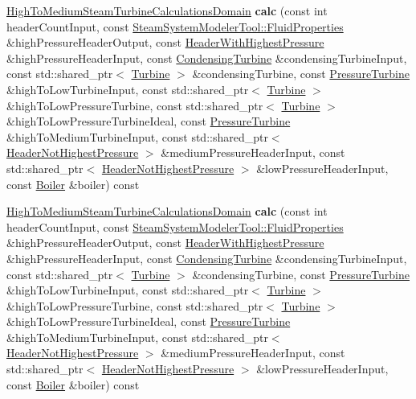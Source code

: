 \begin{DoxyCompactItemize}
\hyperlink{class_high_to_medium_steam_turbine_calculations_domain}{High\+To\+Medium\+Steam\+Turbine\+Calculations\+Domain} {\bfseries calc} (const int header\+Count\+Input, const \hyperlink{struct_steam_system_modeler_tool_1_1_fluid_properties}{Steam\+System\+Modeler\+Tool\+::\+Fluid\+Properties} \&high\+Pressure\+Header\+Output, const \hyperlink{class_header_with_highest_pressure}{Header\+With\+Highest\+Pressure} \&high\+Pressure\+Header\+Input, const \hyperlink{class_condensing_turbine}{Condensing\+Turbine} \&condensing\+Turbine\+Input, const std\+::shared\+\_\+ptr$<$ \hyperlink{class_turbine}{Turbine} $>$ \&condensing\+Turbine, const \hyperlink{class_pressure_turbine}{Pressure\+Turbine} \&high\+To\+Low\+Turbine\+Input, const std\+::shared\+\_\+ptr$<$ \hyperlink{class_turbine}{Turbine} $>$ \&high\+To\+Low\+Pressure\+Turbine, const std\+::shared\+\_\+ptr$<$ \hyperlink{class_turbine}{Turbine} $>$ \&high\+To\+Low\+Pressure\+Turbine\+Ideal, const \hyperlink{class_pressure_turbine}{Pressure\+Turbine} \&high\+To\+Medium\+Turbine\+Input, const std\+::shared\+\_\+ptr$<$ \hyperlink{class_header_not_highest_pressure}{Header\+Not\+Highest\+Pressure} $>$ \&medium\+Pressure\+Header\+Input, const std\+::shared\+\_\+ptr$<$ \hyperlink{class_header_not_highest_pressure}{Header\+Not\+Highest\+Pressure} $>$ \&low\+Pressure\+Header\+Input, const \hyperlink{class_boiler}{Boiler} \&boiler) const
\item 
\mbox{\label{class_high_to_medium_steam_turbine_calculator_a5cc5be18b84b9dd14a955b06c4d3ac5c}} 
\hyperlink{class_high_to_medium_steam_turbine_calculations_domain}{High\+To\+Medium\+Steam\+Turbine\+Calculations\+Domain} {\bfseries calc} (const int header\+Count\+Input, const \hyperlink{struct_steam_system_modeler_tool_1_1_fluid_properties}{Steam\+System\+Modeler\+Tool\+::\+Fluid\+Properties} \&high\+Pressure\+Header\+Output, const \hyperlink{class_header_with_highest_pressure}{Header\+With\+Highest\+Pressure} \&high\+Pressure\+Header\+Input, const \hyperlink{class_condensing_turbine}{Condensing\+Turbine} \&condensing\+Turbine\+Input, const std\+::shared\+\_\+ptr$<$ \hyperlink{class_turbine}{Turbine} $>$ \&condensing\+Turbine, const \hyperlink{class_pressure_turbine}{Pressure\+Turbine} \&high\+To\+Low\+Turbine\+Input, const std\+::shared\+\_\+ptr$<$ \hyperlink{class_turbine}{Turbine} $>$ \&high\+To\+Low\+Pressure\+Turbine, const std\+::shared\+\_\+ptr$<$ \hyperlink{class_turbine}{Turbine} $>$ \&high\+To\+Low\+Pressure\+Turbine\+Ideal, const \hyperlink{class_pressure_turbine}{Pressure\+Turbine} \&high\+To\+Medium\+Turbine\+Input, const std\+::shared\+\_\+ptr$<$ \hyperlink{class_header_not_highest_pressure}{Header\+Not\+Highest\+Pressure} $>$ \&medium\+Pressure\+Header\+Input, const std\+::shared\+\_\+ptr$<$ \hyperlink{class_header_not_highest_pressure}{Header\+Not\+Highest\+Pressure} $>$ \&low\+Pressure\+Header\+Input, const \hyperlink{class_boiler}{Boiler} \&boiler) const
\end{DoxyCompactItemize}


